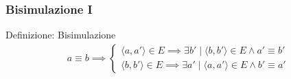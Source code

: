 \documentclass{beamer}
\begin{document}
\begin{frame}\frametitle{Bisimulazione I}
    \begin{block}{Definizione: Bisimulazione}
        \begin{gather*}
            a \equiv b \implies
            \begin{cases}
                \langle a, a' \rangle \in E \implies \exists b' \mid \langle b, b' \rangle \in E \land a' \equiv b'\\
                \langle b, b' \rangle \in E \implies \exists a' \mid \langle a, a' \rangle \in E \land b' \equiv a'
            \end{cases}
        \end{gather*}
    \end{block}

    \begin{figure}
    \end{figure}
\end{frame}
\end{document}
